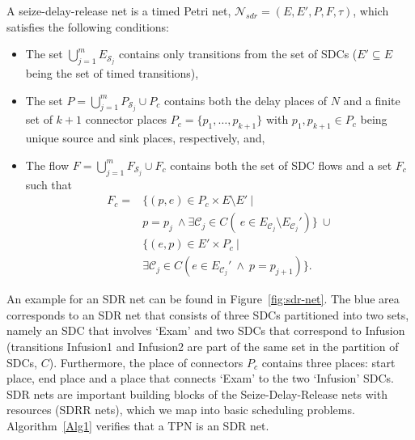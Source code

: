 \begin{mydef}  \label{def:sdnet}
	A seize-delay-release net is a timed Petri net, 
	$\mathcal{N}_{sdr} = (E, E', P , F, \tau)$, which satisfies the following
	conditions:
	\begin{itemize}
		\item The set $\bigcup_{j=1}^{m} E_{\mathcal{S}_j}$ contains only transitions 
		from the set of SDCs ($E' \subseteq E$ being 
		the set of timed transitions), 
		\item The set $P = \bigcup_{j=1}^m P_{\mathcal{S}_j} \cup P_{c}$ contains 
		both the delay places
		of $N$ and a finite set of $k+1$ connector places $P_{c} = \{p_1,\ldots, p_{k+1}\}$
		with $p_1, p_{k+1} \in P_c$ being unique source and sink places, respectively, and, 
		\item The flow $F = \bigcup_{j=1}^m F_{\mathcal{S}_j} \cup F_c$ contains
		both the set of SDC
		flows and a set $F_c$ 
		such that \begin{align} \label{eq1}
		F_c = & \{(p,e) \in P_c \times E \setminus E' \ | \\ & p = p_j \ \land \exists\mathcal{C}_j \in C (\ e \in E_{\mathcal{C}_j} \setminus E_{\mathcal{C}_j}') \} \ \cup \nonumber\\
		&\{(e,p) \in E' \times P_c \ | \\ &\exists \mathcal{C}_j \in C (e \in E_{\mathcal{C}_j}' \ \land \ p = p_{j+1}) \}.
		\end{align}
	\end{itemize}
\end{mydef} An example for an SDR net can be found in Figure~\ref{fig:sdr-net}. The blue area corresponds to an SDR net that consists of three SDCs partitioned
into two sets, namely an SDC that involves `Exam' and two SDCs that correspond to Infusion 
(transitions Infusion1 and Infusion2 are 
part of the same set in the partition of SDCs, $C$). Furthermore,
the place of connectors $P_c$ contains three places: start place, 
end place and 
a place that connects `Exam' to the two `Infusion' SDCs.
SDR nets are important building blocks of the
Seize-Delay-Release nets with resources (SDRR nets),
which we map into basic scheduling problems. Algorithm~\ref{Alg1} verifies that a TPN
is an SDR net.



